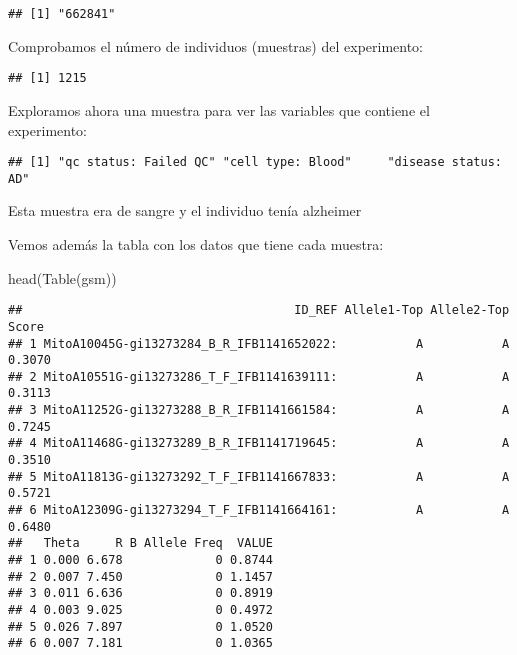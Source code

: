 \documentclass[
]{article}
\newenvironment{Shaded}{\begin{snugshade}}{\end{snugshade}}
\newcommand{\FunctionTok}[1]{\textcolor[rgb]{0.00,0.00,0.00}{#1}}
\newcommand{\NormalTok}[1]{#1}
\newcommand{\OtherTok}[1]{\textcolor[rgb]{0.56,0.35,0.01}{#1}}
\newcommand{\SpecialCharTok}[1]{\textcolor[rgb]{0.00,0.00,0.00}{#1}}
\newcommand{\StringTok}[1]{\textcolor[rgb]{0.31,0.60,0.02}{#1}}
\begin{document}
\begin{verbatim}
## [1] "662841"
\end{verbatim}

Comprobamos el número de individuos (muestras) del experimento:

\begin{Shaded}
\end{Shaded}

\begin{verbatim}
## [1] 1215
\end{verbatim}

Exploramos ahora una muestra para ver las variables que contiene el
experimento:

\begin{Shaded}
\end{Shaded}

\begin{verbatim}
## [1] "qc status: Failed QC" "cell type: Blood"     "disease status: AD"
\end{verbatim}

Esta muestra era de sangre y el individuo tenía alzheimer

Vemos además la tabla con los datos que tiene cada muestra:

\begin{Shaded}
\begin{Highlighting}[]
\FunctionTok{head}\NormalTok{(}\FunctionTok{Table}\NormalTok{(gsm))}
\end{Highlighting}
\end{Shaded}

\begin{verbatim}
##                                      ID_REF Allele1-Top Allele2-Top  Score
## 1 MitoA10045G-gi13273284_B_R_IFB1141652022:           A           A 0.3070
## 2 MitoA10551G-gi13273286_T_F_IFB1141639111:           A           A 0.3113
## 3 MitoA11252G-gi13273288_B_R_IFB1141661584:           A           A 0.7245
## 4 MitoA11468G-gi13273289_B_R_IFB1141719645:           A           A 0.3510
## 5 MitoA11813G-gi13273292_T_F_IFB1141667833:           A           A 0.5721
## 6 MitoA12309G-gi13273294_T_F_IFB1141664161:           A           A 0.6480
##   Theta     R B Allele Freq  VALUE
## 1 0.000 6.678             0 0.8744
## 2 0.007 7.450             0 1.1457
## 3 0.011 6.636             0 0.8919
## 4 0.003 9.025             0 0.4972
## 5 0.026 7.897             0 1.0520
## 6 0.007 7.181             0 1.0365
\end{verbatim}
\end{document}
